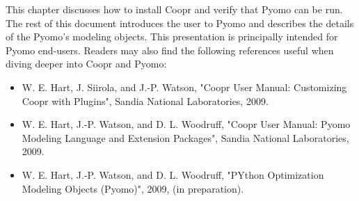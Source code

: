 This chapter discusses how to install Coopr and verify that Pyomo can
be run.  The rest of this document introduces the user to Pyomo and
describes the details of the Pyomo's modeling objects.  This presentation
is principally intended for Pyomo end-users.  Readers may also find the
following references useful when diving deeper into Coopr and Pyomo:
\begin{itemize}

\item W. E. Hart, J. Siirola, and J.-P. Watson, "Coopr User Manual: Customizing Coopr with Plugins", Sandia National Laboratories, 2009.

\item W. E. Hart, J.-P. Watson, and D. L. Woodruff, "Coopr User Manual: Pyomo Modeling Language and Extension Packages", Sandia National Laboratories, 2009.

\item W. E. Hart, J.-P. Watson, and D. L. Woodruff, "PYthon Optimization Modeling Objects (Pyomo)", 2009, (in preparation).

\end{itemize}




